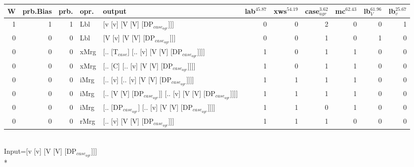 \begin{tabularx}{\linewidth}{rrrlXrrrrrr}
\hline
   W &   prb.Bias &   prb. & opr.   & output                                                    &   lab$^{45.87}$ &   xws$^{54.19}$ &   case$_{agr}^{3.62}$ &   mc$^{62.43}$ &   lb$_{V}^{61.96}$ &   lb$_{v}^{25.67}$ \\
\hline
   1 &       1 &   1 & Lbl  & [v [v] [V [V] [DP$_{case_{agr}}$]]]                             &             0 &             0 &                  2 &            0 &              0 &              1 \\
   0 &       0 &   0 & Lbl  & [V [v] [V [V] [DP$_{case_{agr}}$]]]                             &             0 &             0 &                  1 &            0 &              1 &              0 \\
   0 &       0 &   0 & xMrg & [.. [T$_{case}$] [.. [v] [V [V] [DP$_{case_{agr}}$]]]]              &             1 &             0 &                  1 &            1 &              0 &              0 \\
   0 &       0 &   0 & xMrg & [.. [C] [.. [v] [V [V] [DP$_{case_{agr}}$]]]]                   &             1 &             0 &                  1 &            1 &              0 &              0 \\
   0 &       0 &   0 & iMrg & [.. [v] [.. [v] [V [V] [DP$_{case_{agr}}$]]]]                   &             1 &             1 &                  1 &            1 &              0 &              0 \\
   0 &       0 &   0 & iMrg & [.. [V [V] [DP$_{case_{agr}}$]] [.. [v] [V [V] [DP$_{case_{agr}}$]]]] &             1 &             1 &                  1 &            1 &              0 &              0 \\
   0 &       0 &   0 & iMrg & [.. [DP$_{case_{agr}}$] [.. [v] [V [V] [DP$_{case_{agr}}$]]]]         &             1 &             1 &                  0 &            1 &              0 &              0 \\
   0 &       0 &   0 & rMrg & [.. [v] [V [V] [DP$_{case_{agr}}$]]]                            &             1 &             1 &                  1 &            0 &              0 &              0 \\
\hline
\end{tabularx}\endgroup\\
\begingroup\scriptsize Input=[v [v] [V [V] [DP$_{case_{agr}}$]]]\\*
